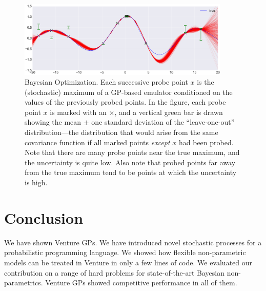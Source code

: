 \documentclass{article} %
\begin{document}
\begin{figure}
\centering
    \includegraphics[width=0.9\textwidth]{figs/BayesOpta.png}
    \caption{Bayesian Optimization.
      Each successive probe point $x$ is the (stochastic) maximum of a GP-based emulator conditioned on the values of the previously probed points.
      In the figure, each probe point $x$ is marked with an $\times$, and a vertical green bar is drawn showing the mean $\pm$ one standard deviation of the ``leave-one-out'' distribution---the distribution that would arise from the same covariance function if all marked points {\em except} $x$ had been probed.
      Note that there are many probe points near the true maximum, and the uncertainty is quite low.
      Also note that probed points far away from the true maximum tend to be points at which the uncertainty is high.}
    \label{fig:structureCo2}
\end{figure}




\section{Conclusion}
We have shown Venture GPs. We have introduced novel stochastic processes for a probabilistic programming language. We showed how flexible non-parametric models can be treated in Venture in only a few lines of code. We evaluated our contribution on a range of hard problems for state-of-the-art Bayesian non-parametrics. Venture GPs showed competitive performance in all of them. 


\newpage


\end{document}

